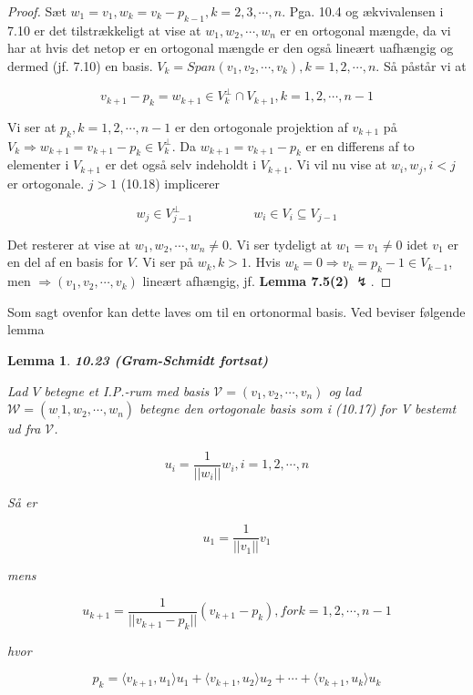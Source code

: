 \documentclass[paper=a4, fontsize=11pt]{scrartcl} %
\newtheorem*{lemma}{Lemma}
\newenvironment{cstmlemma}[1]{\begin{lemma} {\normalfont\textbf{#1}}}{\end{lemma}}
\begin{document}
	\begin{proof}
		
		Sæt $w_1 = v_1, w_k = v_k - p_{k-1}, k = 2,3,\cdots,n$. Pga. 10.4 og ækvivalensen i 7.10 er det tilstrækkeligt at vise at $w_1,w_2,\cdots,w_n$ er en ortogonal mængde, da vi har at hvis det netop er en ortogonal mængde er den også lineært uafhængig og dermed (jf. 7.10) en basis.
		$V_k = Span(v_1,v_2,\cdots,v_k), k = 1,2,\cdots,n$. Så påstår vi at
		
		\[v_{k+1}-p_k=w_{k+1} \in V_k^{\bot} \cap V_{k+1}, k = 1,2,\cdots,n-1 \tag{10.18}\]
		
		Vi ser at $p_k, k = 1,2,\cdots,n-1$ er den ortogonale projektion af $v_{k+1}$ på $V_k \Rightarrow w_{k+1} = v_{k+1} - p_k \in V_k^{\bot}$. Da $w_{k+1} = v_{k+1} - p_k$ er en differens af to elementer i $V_{k+1}$ er det også selv indeholdt i $V_{k+1}$. Vi vil nu vise at $w_i, w_j, i < j$ er ortogonale. $j > 1$ (10.18) implicerer
		
		\[w_j\in V^\bot_{j-1} \hspace{2cm} w_i\in V_i\subseteq V_{j-1}\]
		
		Det resterer at vise at $w_1,w_2,\cdots,w_n \not = 0$. Vi ser tydeligt at $w_1 = v_1 \not = 0$ idet $v_1$ er en del af en basis for $V$. Vi ser på $w_k, k > 1$. Hvis $w_k = 0 \Rightarrow v_{k} = p_k-1 \in V_{k-1}$, men $\Rightarrow (v_1,v_2,\cdots,v_k)$ lineært afhængig, jf. \textbf{Lemma 7.5(2)} $\lightning$.
		
	\end{proof}
	
	Som sagt ovenfor kan dette laves om til en ortonormal basis. Ved beviser følgende lemma
	
	\begin{cstmlemma}{10.23 (Gram-Schmidt fortsat)}
		
		
		Lad $V$ betegne et I.P.-rum med basis $\mathcal{V} = (v_1,v_2,\cdots,v_n)$ og lad $\mathcal{W} = (w_,1,w_2,\cdots,w_n)$ betegne den ortogonale basis som i (10.17) for V bestemt ud fra $\mathcal{V}$.
		
		\[u_i = \frac{1}{||w_i||}w_i, i = 1,2,\cdots,n\]
		
		Så er 
		
		\[u_1 = \frac{1}{||v_1||}v_1\]
		
		mens
		
		\[u_{k+1} = \frac{1}{||v_{k+1}-p_k||}(v_{k+1}-p_k), for k = 1,2,\cdots,n-1\]
		
		hvor
		
		\[p_k = \langle v_{k+1} , u_1 \rangle u_1 + \langle v_{k+1},u_2 \rangle u_2 + \cdots + \langle v_{k+1},u_k \rangle u_k \tag{10.22}\]
		
	\end{cstmlemma}
	
\end{document}
